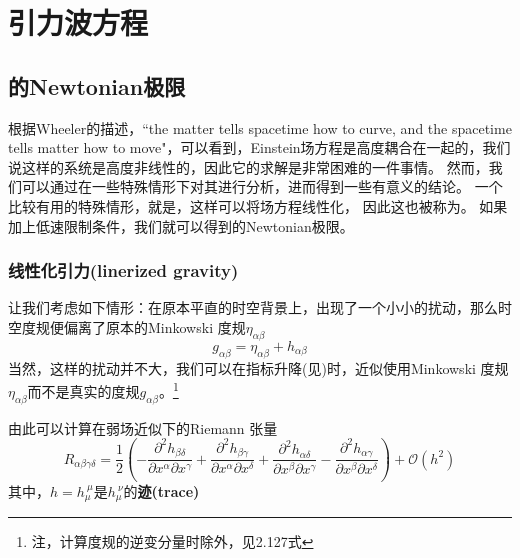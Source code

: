 
\chapter{引力波方程}
\label{chap2}

\section{\GR 的Newtonian极限}
根据Wheeler的描述，``the matter tells spacetime how to curve, and the spacetime tells matter how to move"，可以看到，Einstein场方程是高度耦合在一起的，我们说这样的系统是高度非线性的，因此它的求解是非常困难的一件事情。
然而，我们可以通过在一些特殊情形下对其进行分析，进而得到一些有意义的结论。
一个比较有用的特殊情形，就是{}，这样可以将场方程线性化， 因此这也被称为{}。
如果加上低速限制条件，我们就可以得到\GR 的Newtonian极限。

\subsection{线性化引力(linerized gravity)}
让我们考虑如下情形：在原本平直的时空背景上，出现了一个小小的扰动，那么时空度规便偏离了原本的Minkowski 度规$\eta_{\alpha\beta}$
\begin{equation}\label{eq:LinearMetric} 
  g_{\alpha\beta}=  \eta _{\alpha\beta} + h_{\alpha\beta}
\end{equation}
当然，这样的扰动并不大，我们可以在指标升降(见)时，近似使用Minkowski 度规$\eta _{\alpha\beta}$而不是真实的度规$g_{\alpha\beta}$。\footnote{注，计算度规的逆变分量时除外，见\cite{Creighton2011}2.127式}

由此可以计算在弱场近似下的Riemann 张量
\begin{equation}\label{eq:RiemannTensorLin}
  R_{\alpha\beta\gamma\delta}= \frac{1}{2}\left(- \frac{\partial^2 h_{\beta\delta}}{\partial x^\alpha \partial x^\gamma} + \frac{\partial^2 h_{\beta\gamma}}{\partial x^\alpha \partial x^\delta} + \frac{\partial^2 h_{\alpha\delta}}{\partial x^\beta \partial x^\gamma} - \frac{\partial^2 h_{\alpha\gamma}}{\partial x^\beta \partial x^\delta}  \right) + \mathcal{O}(h^2)
\end{equation}
其中，$h = h_\mu^{~\mu}$是$h_\mu^{~\nu}$的{\textbf{迹(trace)}}


